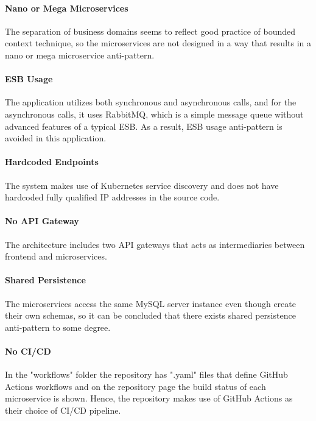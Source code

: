 \documentclass{Configuration_Files/PoliMi3i_thesis}
\begin{document}
\paragraph{Nano or Mega Microservices} The separation of business domains seems to reflect good practice of bounded context technique, so the microservices are not designed in a way that results in a nano or mega microservice anti-pattern.

\paragraph{ESB Usage} The application utilizes both synchronous and asynchronous calls, and for the asynchronous calls, it uses RabbitMQ, which is a simple message queue without advanced features of a typical ESB.
As a result, ESB usage anti-pattern is avoided in this application.

\paragraph{Hardcoded Endpoints} The system makes use of Kubernetes service discovery and does not have hardcoded fully qualified IP addresses in the source code.

\paragraph{No API Gateway} The architecture includes two API gateways that acts as intermediaries between frontend and microservices.

\paragraph{Shared Persistence} The microservices access the same MySQL server instance even though create their own schemas, so it can be concluded that there exists shared persistence anti-pattern to some degree.

\paragraph{No CI/CD} In the "workflows" folder the repository has ".yaml" files that define GitHub Actions\footnotemark[71] workflows and on the repository page the build status of each microservice is shown.
Hence, the repository makes use of GitHub Actions as their choice of CI/CD pipeline.
\end{document}
